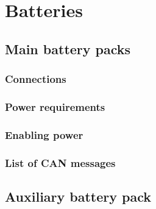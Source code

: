 \chapter{Batteries}
\blindtext

\section{Main battery packs}
\blindtext
\subsection{Connections}
\blindtext
\subsection{Power requirements}
\blindtext
\subsection{Enabling power}
\blindtext
\subsection{List of CAN messages}
\blindtext

\section{Auxiliary battery pack}
\blindtext

